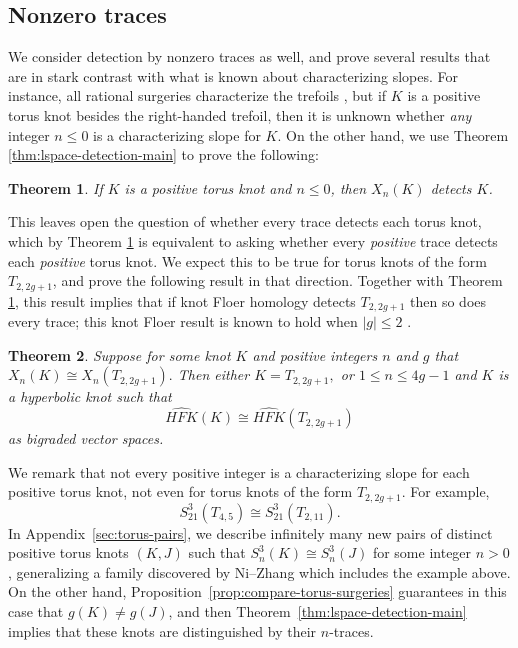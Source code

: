 \documentclass[11pt]{amsart}
\newtheorem {theorem}{Theorem}
\numberwithin{equation}{section}
\numberwithin{theorem}{section}
\theoremstyle{definition}
\newcommand\hfk{\mathit{HFK}}
\newcommand\hfkhat{\widehat{\hfk}}
\begin{document}
\subsection{Nonzero traces}
We  consider detection by nonzero traces as well, and prove several results that are in stark contrast with what is known about characterizing slopes. For instance, all rational surgeries characterize the trefoils  \cite{osz-characterizing}, but if $K$ is a positive torus knot besides the right-handed trefoil, then it is  unknown whether \emph{any} integer $n\leq 0$ is a characterizing slope for $K$. On the other hand, we use Theorem \ref{thm:lspace-detection-main} to prove the following:

\begin{theorem}
\label{thm:negtracetorus}
If $K$ is a positive torus knot and $n\leq 0$, then $X_n(K)$ detects $K$.
\end{theorem}

This leaves open the question of whether every trace detects each torus knot, which by Theorem \ref{thm:negtracetorus} is equivalent to asking whether every \emph{positive} trace detects each \emph{positive} torus knot. We expect this to be true for torus knots of the form $T_{2,2g+1}$, and  prove the following  result in that direction. Together with Theorem \ref{thm:negtracetorus}, this result implies  that if knot Floer homology detects $T_{2,2g+1}$ then  so does every trace; this knot Floer result  is   known  to hold when $|g| \leq 2$ \cite{osz-genus,ghiggini,frw-cinquefoil}.

\begin{theorem} \label{thm:positive-trace-t2n-main}
Suppose for some knot $K$ and  positive integers $n$ and $g$ that $X_n(K) \cong X_n(T_{2,2g+1}).$  Then either $K = T_{2,2g+1},$ or $1 \leq n \leq 4g-1$ and $K$ is a hyperbolic knot such that \[\hfkhat(K) \cong \hfkhat(T_{2,2g+1})\] as bigraded vector spaces.
\end{theorem}


We remark that not every positive integer is a characterizing slope for each positive torus knot, not even for torus knots of the form $T_{2,2g+1}$. For example, \[S^3_{21}(T_{4,5}) \cong S^3_{21}(T_{2,11}).\] In Appendix~\ref{sec:torus-pairs}, we describe infinitely many new pairs of distinct positive torus knots $(K,J)$  such that $S^3_n(K) \cong S^3_n(J)$ for some integer $n>0$, generalizing a family discovered by Ni--Zhang \cite{ni-zhang-torus-1} which includes the example above. On the other hand, Proposition~\ref{prop:compare-torus-surgeries} guarantees in this case that $g(K) \neq g(J)$, and then Theorem~\ref{thm:lspace-detection-main} implies that these knots are distinguished by their $n$-traces.
\end{document}

